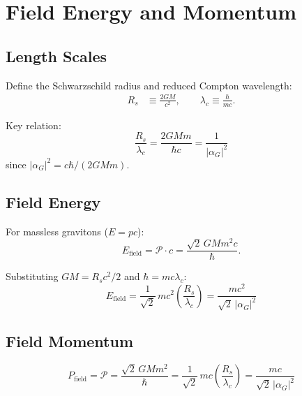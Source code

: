 \documentclass[11pt,a4paper]{article}
\theoremstyle{definition}
\theoremstyle{remark}
\begin{document}
	\section{Field Energy and Momentum}
	
	\subsection{Length Scales}
	
	Define the Schwarzschild radius and reduced Compton wavelength:
	\begin{align}
		R_s &\equiv \frac{2GM}{c^2}, \qquad \lambda_c \equiv \frac{\hbar}{mc}.
	\end{align}
	
	Key relation:
	\begin{equation}
		\frac{R_s}{\lambda_c} = \frac{2GMm}{\hbar c} = \frac{1}{|\alpha_G|^2}
		\label{eq:Rs_lambda_relation}
	\end{equation}
	since $|\alpha_G|^2 = c\hbar/(2GMm)$.
	
	\subsection{Field Energy}
	
	For massless gravitons ($E=pc$):
	\begin{equation}
		E_{\mathrm{field}} = \mathcal{P}\cdot c = \frac{\sqrt{2}\,GMm^2c}{\hbar}.
	\end{equation}
	
	Substituting $GM=R_sc^2/2$ and $\hbar=mc\lambda_c$:
	\begin{equation}
		\boxed{E_{\mathrm{field}} = \frac{1}{\sqrt{2}}\,mc^2\left(\frac{R_s}{\lambda_c}\right) = \frac{mc^2}{\sqrt{2}\,|\alpha_G|^2}}
		\label{eq:E_field}
	\end{equation}
	
	\subsection{Field Momentum}
	
	\begin{equation}
		\boxed{P_{\mathrm{field}} = \mathcal{P} = \frac{\sqrt{2}\,GMm^2}{\hbar} = \frac{1}{\sqrt{2}}\,mc\left(\frac{R_s}{\lambda_c}\right) = \frac{mc}{\sqrt{2}\,|\alpha_G|^2}}
		\label{eq:P_field}
	\end{equation}
	
\end{document}
